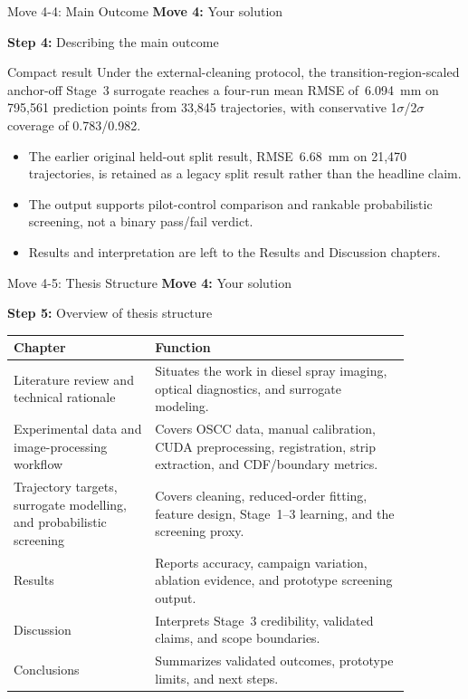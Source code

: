 \documentclass[aspectratio=169,11pt]{beamer}
\newcommand{\movetag}[2]{\textbf{Move #1:} #2}
\newcommand{\steptag}[2]{\textbf{Step #1:} #2}
\begin{document}
\begin{frame}{Move 4-4: Main Outcome}
\footnotesize
\movetag{4}{Your solution}

\vspace{0.5em}
\steptag{4}{Describing the main outcome}

\vspace{0.5em}
\begin{block}{Compact result}
Under the external-cleaning protocol, the transition-region-scaled anchor-off Stage~3 surrogate reaches a four-run mean RMSE of~\SI{6.094}{mm} on 795{,}561 prediction points from 33{,}845 trajectories, with conservative 1$\sigma$/2$\sigma$ coverage of 0.783/0.982.
\end{block}

\vspace{0.4em}
\begin{itemize}
  \item The earlier original held-out split result, RMSE~\SI{6.68}{mm} on 21{,}470 trajectories, is retained as a legacy split result rather than the headline claim.
  \item The output supports pilot-control comparison and rankable probabilistic screening, not a binary pass/fail verdict.
  \item Results and interpretation are left to the Results and Discussion chapters.
\end{itemize}
\end{frame}

\begin{frame}{Move 4-5: Thesis Structure}
\scriptsize
\movetag{4}{Your solution}

\vspace{0.5em}
\steptag{5}{Overview of thesis structure}

\vspace{0.6em}
\begin{tabular}{L{0.31\linewidth}L{0.56\linewidth}}
\toprule
Chapter & Function \\
\midrule
Literature review and technical rationale & Situates the work in diesel spray imaging, optical diagnostics, and surrogate modeling. \\
Experimental data and image-processing workflow & Covers OSCC data, manual calibration, CUDA preprocessing, registration, strip extraction, and CDF/boundary metrics. \\
Trajectory targets, surrogate modelling, and probabilistic screening & Covers cleaning, reduced-order fitting, feature design, Stage~1--3 learning, and the screening proxy. \\
Results & Reports accuracy, campaign variation, ablation evidence, and prototype screening output. \\
Discussion & Interprets Stage~3 credibility, validated claims, and scope boundaries. \\
Conclusions & Summarizes validated outcomes, prototype limits, and next steps. \\
\bottomrule
\end{tabular}
\end{frame}
\end{document}
